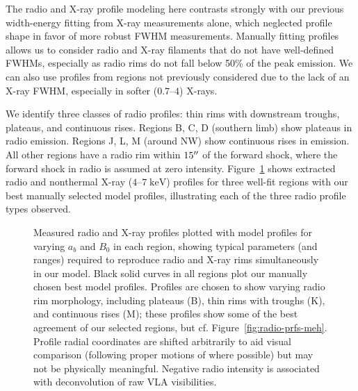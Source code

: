\documentclass[iop, apj, numberedappendix]{emulateapj}
\newcommand*{\mt}{\mathrm}
\newcommand*{\unit}[1]{\;\mt{#1}}  %
\begin{document}
The radio and X-ray profile modeling here contrasts strongly with our previous
width-energy fitting from X-ray measurements alone, which neglected profile
shape in favor of more robust FWHM measurements.  Manually fitting profiles
allows us to consider radio and X-ray filaments that do not have well-defined
FWHMs, especially as radio rims do not fall below 50\% of the peak emission.
We can also use profiles from regions not previously considered due to the lack
of an X-ray FWHM, especially in softer ($0.7$--$4$) X-rays.

We identify three classes of radio profiles: thin rims with downstream troughs,
plateaus, and continuous rises.  Regions B, C, D (southern limb) show plateaus
in radio emission.  Regions J, L, M (around NW) show continuous rises in
emission.  All other regions have a radio rim within $15\mbox{$^{\prime\prime}$}$ of the forward
shock, where the forward shock in radio is assumed at zero intensity.
Figure~\ref{fig:radio-prfs} shows extracted radio and nonthermal X-ray
($4$--$7\unit{keV}$) profiles for three well-fit regions with our best manually
selected model profiles, illustrating each of the three radio profile types
observed.

\begin{figure}
    \centering
    \iftoggle{manuscript}{
        \epsscale{0.6}
        \plotone{figures/radio-fits-B.pdf} \\
        \plotone{figures/radio-fits-K.pdf} \\
        \plotone{figures/radio-fits-M.pdf}
        \epsscale{1}
    }{
        \texttt{[image: figures/radio-fits-B.pdf]} \\
        \texttt{[image: figures/radio-fits-K.pdf]} \\
        \texttt{[image: figures/radio-fits-M.pdf]}
    }
    \caption{Measured radio and X-ray profiles plotted with model profiles for
    varying $a_b$ and $B_0$ in each region, showing typical parameters (and
    ranges) required to reproduce radio and X-ray rims simultaneously in our
    model.  Black solid curves in all regions plot our manually chosen best
    model profiles.  Profiles are chosen to show varying radio rim morphology,
    including plateaus (B), thin rims with troughs (K), and continuous rises
    (M); these profiles show some of the best agreement of our selected
    regions, but cf. Figure~\ref{fig:radio-prfs-meh}.  Profile radial
    coordinates are shifted arbitrarily to aid visual comparison (following
    proper motions of \citet{katsuda2010-tycho} where possible) but may not be
    physically meaningful.  Negative radio intensity is associated with
    deconvolution of raw VLA visibilities.
    \label{fig:radio-prfs}}
\end{figure}
\end{document}
